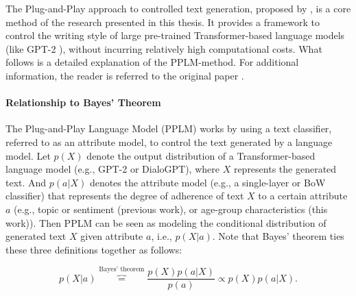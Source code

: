 The Plug-and-Play approach to controlled text generation, proposed by \cite{dathathri2019plug}, is a core method of the research presented in this thesis. It provides a framework to control the writing style of large pre-trained Transformer-based language models (like GPT-2 \citep{radford2019language}), without incurring relatively high computational costs. What follows is a detailed explanation of the PPLM-method. For additional information, the reader is referred to the original paper \citep{dathathri2019plug}.

\paragraph{Relationship to Bayes' Theorem} The Plug-and-Play Language Model (PPLM) works by using a text classifier, referred to as an attribute model, to control the text generated by a language model. Let $p(X)$ denote the output distribution of a Transformer-based language model (e.g., GPT-2 or DialoGPT), where $X$ represents the generated text. And $p(a | X)$ denotes the attribute model (e.g., a single-layer or BoW classifier) that represents the degree of adherence of text $X$ to a certain attribute $a$ (e.g., topic or sentiment (previous work), or age-group characteristics (this work)). Then PPLM can be seen as modeling the conditional distribution of generated text $X$ given attribute $a$, i.e., $p(X | a)$. Note that Bayes' theorem ties these three definitions together as follows:

\begin{equation}
    p(X | a) \overbrace{=}^{\text{Bayes' theorem}} 
    \frac{p(X) p(a | X)}{p(a)} \propto
    p(X)p(a | X).
\end{equation}

